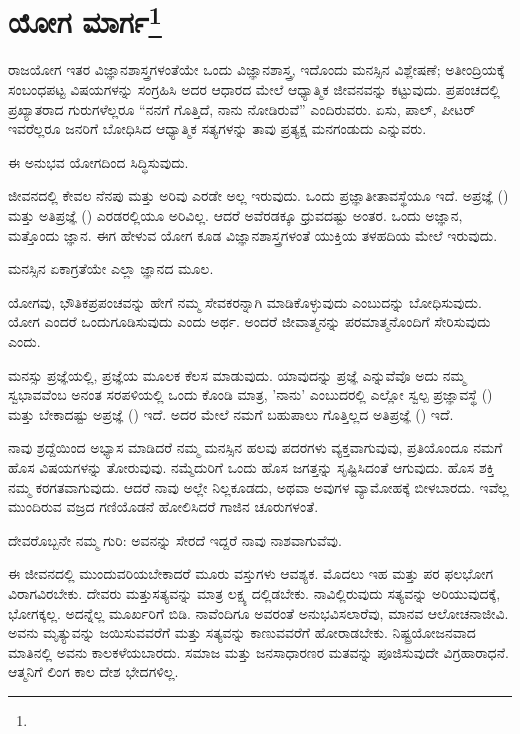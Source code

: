
\chapter[ಯೋಗ ಮಾರ್ಗ]{ಯೋಗ ಮಾರ್ಗ\protect\footnote{}}

ರಾಜಯೋಗ ಇತರ ವಿಜ್ಞಾನಶಾಸ್ತ್ರಗಳಂತೆಯೇ ಒಂದು ವಿಜ್ಞಾನಶಾಸ್ತ್ರ, ಇದೊಂದು ಮನಸ್ಸಿನ ವಿಶ್ಲೇಷಣೆ; ಅತೀಂದ್ರಿಯಕ್ಕೆ ಸಂಬಂಧಪಟ್ಟ ವಿಷಯಗಳನ್ನು ಸಂಗ್ರಹಿಸಿ ಅದರ ಆಧಾರದ ಮೇಲೆ ಆಧ್ಯಾತ್ಮಿಕ ಜೀವನವನ್ನು ಕಟ್ಟುವುದು. ಪ್ರಪಂಚದಲ್ಲಿ ಪ್ರಖ್ಯಾತರಾದ ಗುರುಗಳೆಲ್ಲರೂ “ನನಗೆ ಗೊತ್ತಿದೆ, ನಾನು ನೋಡಿರುವೆ” ಎಂದಿರುವರು. ಏಸು, ಪಾಲ್, ಪೀಟರ್ ಇವರೆಲ್ಲರೂ ಜನರಿಗೆ ಬೋಧಿಸಿದ ಆಧ್ಯಾತ್ಮಿಕ ಸತ್ಯಗಳನ್ನು ತಾವು ಪ್ರತ್ಯಕ್ಷ ಮನಗಂಡುದು ಎನ್ನುವರು.

ಈ ಅನುಭವ ಯೋಗದಿಂದ ಸಿದ್ಧಿಸುವುದು.

ಜೀವನದಲ್ಲಿ ಕೇವಲ ನೆನಪು ಮತ್ತು ಅರಿವು ಎರಡೇ ಅಲ್ಲ ಇರುವುದು. ಒಂದು ಪ್ರಜ್ಞಾತೀತಾವಸ್ಥೆಯೂ ಇದೆ. ಅಪ್ರಜ್ಞೆ () ಮತ್ತು ಅತಿಪ್ರಜ್ಞೆ () ಎರಡರಲ್ಲಿಯೂ ಅರಿವಿಲ್ಲ. ಆದರೆ ಅವೆರಡಕ್ಕೂ ಧ್ರುವದಷ್ಟು ಅಂತರ. ಒಂದು ಅಜ್ಞಾನ, ಮತ್ತೊಂದು ಜ್ಞಾನ. ಈಗ ಹೇಳುವ ಯೋಗ ಕೂಡ ವಿಜ್ಞಾನಶಾಸ್ತ್ರಗಳಂತೆ ಯುಕ್ತಿಯ ತಳಹದಿಯ ಮೇಲೆ ಇರುವುದು.

ಮನಸ್ಸಿನ ಏಕಾಗ್ರತೆಯೇ ಎಲ್ಲಾ ಜ್ಞಾನದ ಮೂಲ.

ಯೋಗವು, ಭೌತಿಕಪ್ರಪಂಚವನ್ನು ಹೇಗೆ ನಮ್ಮ ಸೇವಕರನ್ನಾಗಿ ಮಾಡಿಕೊಳ್ಳುವುದು ಎಂಬುದನ್ನು ಬೋಧಿಸುವುದು. ಯೋಗ ಎಂದರೆ ಒಂದುಗೂಡಿಸುವುದು ಎಂದು ಅರ್ಥ. ಅಂದರೆ ಜೀವಾತ್ಮನನ್ನು ಪರಮಾತ್ಮನೊಂದಿಗೆ ಸೇರಿಸುವುದು ಎಂದು.

ಮನಸ್ಸು ಪ್ರಜ್ಞೆಯಲ್ಲಿ, ಪ್ರಜ್ಞೆಯ ಮೂಲಕ ಕೆಲಸ ಮಾಡುವುದು. ಯಾವುದನ್ನು ಪ್ರಜ್ಞೆ ಎನ್ನುವೆವೊ ಅದು ನಮ್ಮ ಸ್ವಭಾವವೆಂಬ ಅನಂತ ಸರಪಳಿಯಲ್ಲಿ ಒಂದು ಕೊಂಡಿ ಮಾತ್ರ, 'ನಾನು' ಎಂಬುದರಲ್ಲಿ ಎಲ್ಲೋ ಸ್ವಲ್ಪ ಪ್ರಜ್ಞಾವಸ್ಥೆ () ಮತ್ತು ಬೇಕಾದಷ್ಟು ಅಪ್ರಜ್ಞೆ () ಇದೆ. ಅದರ ಮೇಲೆ ನಮಗೆ ಬಹುಪಾಲು ಗೊತ್ತಿಲ್ಲದ ಅತಿಪ್ರಜ್ಞೆ () ಇದೆ.

ನಾವು ಶ್ರದ್ದೆಯಿಂದ ಅಭ್ಯಾಸ ಮಾಡಿದರೆ ನಮ್ಮ ಮನಸ್ಸಿನ ಹಲವು ಪದರಗಳು ವ್ಯಕ್ತವಾಗುವುವು, ಪ್ರತಿಯೊಂದೂ ನಮಗೆ ಹೊಸ ವಿಷಯಗಳನ್ನು ತೋರುವುವು. ನಮ್ಮೆದುರಿಗೆ ಒಂದು ಹೊಸ ಜಗತ್ತನ್ನು ಸೃಷ್ಟಿಸಿದಂತೆ ಆಗುವುದು. ಹೊಸ ಶಕ್ತಿ ನಮ್ಮ ಕರಗತವಾಗುವುದು. ಆದರೆ ನಾವು ಅಲ್ಲೇ ನಿಲ್ಲಕೂಡದು, ಅಥವಾ ಅವುಗಳ ವ್ಯಾಮೋಹಕ್ಕೆ ಬೀಳಬಾರದು. ಇವೆಲ್ಲ ಮುಂದಿರುವ ವಜ್ರದ ಗಣಿಯೊಡನೆ ಹೋಲಿಸಿದರೆ ಗಾಜಿನ ಚೂರುಗಳಂತೆ.

ದೇವರೊಬ್ಬನೇ ನಮ್ಮ ಗುರಿ: ಅವನನ್ನು ಸೇರದೆ ಇದ್ದರೆ ನಾವು ನಾಶವಾಗುವೆವು.

ಈ ಜೀವನದಲ್ಲಿ ಮುಂದುವರಿಯಬೇಕಾದರೆ ಮೂರು ವಸ್ತುಗಳು ಆವಶ್ಯಕ. ಮೊದಲು ಇಹ ಮತ್ತು ಪರ ಫಲಭೋಗ ವಿರಾಗವಿರಬೇಕು. ದೇವರು ಮತ್ತು\break ಸತ್ಯವನ್ನು ಮಾತ್ರ ಲಕ್ಷ್ಯ ದಲ್ಲಿಡಬೇಕು. ನಾವಿಲ್ಲಿರುವುದು ಸತ್ಯವನ್ನು ಅರಿಯುವುದಕ್ಕೆ, ಭೋಗಕ್ಕಲ್ಲ. ಅದನ್ನೆಲ್ಲ ಮೂರ್ಖರಿಗೆ ಬಿಡಿ. ನಾವೆಂದಿಗೂ ಅವರಂತೆ ಅನುಭವಿಸಲಾರೆವು, ಮಾನವ ಆಲೋಚನಾಜೀವಿ. ಅವನು ಮೃತ್ಯುವನ್ನು ಜಯಿಸುವವರೆಗೆ ಮತ್ತು ಸತ್ಯವನ್ನು ಕಾಣುವವರೆಗೆ ಹೋರಾಡಬೇಕು. ನಿಷ್ಟ್ರಯೋಜನವಾದ ಮಾತಿನಲ್ಲಿ ಅವನು ಕಾಲಕಳೆಯಬಾರದು. ಸಮಾಜ ಮತ್ತು ಜನಸಾಧಾರಣರ ಮತವನ್ನು ಪೂಜಿಸುವುದೇ ವಿಗ್ರಹಾರಾಧನೆ. ಆತ್ಮನಿಗೆ ಲಿಂಗ ಕಾಲ ದೇಶ ಭೇದಗಳಿಲ್ಲ.


